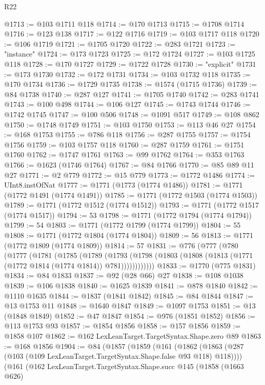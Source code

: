 \begin{lexlean}{R22}
\begin{coremodule}
{{{{{{{{{{{{{{{{{{{{{{{{{{{{{{{{{{{{{{{{{{{{{{{{{{{{@1713 := @103 @1711 @118
@1714 := @170 @1713
@1715 := @1708 @1714
@1716 := @123 @138
@1717 := @122 @1716
@1719 := @103 @1717 @118
@1720 := @106 @1719
@1721 := @1705 @1720
@1722 := @283 @1721
@1723 := "instance"
@1724 := @173 @1723
@1725 := @172 @1724
@1727 := @103 @1725 @118
@1728 := @170 @1727
@1729 := @1722 @1728
@1730 := "explicit"
@1731 := @173 @1730
@1732 := @172 @1731
@1734 := @103 @1732 @118
@1735 := @170 @1734
@1736 := @1729 @1735
@1738 := @1574 (@1715 @1736)
@1739 := @84 @1738
@1740 := @287 @127
@1741 := @1705 @1740
@1742 := @283 @1741
@1743 := @100 @498
@1744 := @106 @127
@1745 := @1743 @1744
@1746 := @1742 @1745
@1747 := @100 @506
@1748 := @1091 @517
@1749 := @108 @862
@1750 := @1748 @1749
@1751 := @103 @1750
@1753 := @113 @46 @27
@1754 := @168 @1753
@1755 := @786 @118
@1756 := @287 @1755
@1757 := @1754 @1756
@1759 := @103 @1757 @118
@1760 := @287 @1759
@1761 := @1751 @1760
@1762 := @1747 @1761
@1763 := @99 @1762
@1764 := @353 @1763
@1766 := @1623 (@1746 @1764)
@1767 := @84 @1766
@1770 := @85 @89 @11 @27
@1771 := @2 @779
@1772 := @15 @779
@1773 := @1772 @1486
@1774 := UInt8.instOfNat
@1777 := @1771 (@1773 (@1774 @1486))
@1781 := @1771 (@1772 @1491 (@1774 @1491))
@1785 := @1771 (@1772 @1503 (@1774 @1503))
@1789 := @1771 (@1772 @1512 (@1774 @1512))
@1793 := @1771 (@1772 @1517 (@1774 @1517))
@1794 := 53
@1798 := @1771 (@1772 @1794 (@1774 @1794))
@1799 := 54
@1803 := @1771 (@1772 @1799 (@1774 @1799))
@1804 := 55
@1808 := @1771 (@1772 @1804 (@1774 @1804))
@1809 := 56
@1813 := @1771 (@1772 @1809 (@1774 @1809))
@1814 := 57
@1831 := @776
    (@777
      (@780
        (@1777
          (@1781
            (@1785
              (@1789
                (@1793
                  (@1798 (@1803 (@1808 (@1813 (@1771 (@1772 @1814 (@1774 @1814)) @781))))))))))))
@1833 := @1770 (@775 @1831)
@1834 := @84 @1833
@1837 := @92 (@28 @66) @27
@1838 := @108 @1038
@1839 := @106 @1838
@1840 := @1625 @1839
@1841 := @878 @1840
@1842 := @1110 @1635
@1844 := @1837 (@1841 @1842)
@1845 := @84 @1844
@1847 := @13 @1753 @11
@1848 := @1640 @1847
@1849 := @1097 @1753
@1851 := @13 (@1848 @1849)
@1852 := @47 @1847
@1854 := @976 (@1851 @1852)
@1856 := @113 @1753 @93
@1857 := @1854 @1856
@1858 := @157 @1856
@1859 := @1858 @107
@1862 := @162 LexLeanTarget.TargetSyntax.Shape.zero @89
@1863 := @168 @1856
@1904 := @84
    (@1857
      (@1859
        (@161
          (@1862 (@1863 (@287 (@103 (@109 LexLeanTarget.TargetSyntax.Shape.false @93 @118) @118))))
          (@161
            (@162
              LexLeanTarget.TargetSyntax.Shape.succ
              @145
              (@1858
                (@1663 @626)
}}}}}}}}}}}}}}}}}}}}}}}}}}}}}}}}}}}}}}}}}}}}}}}}}}}}
\end{coremodule}
\end{lexlean}
